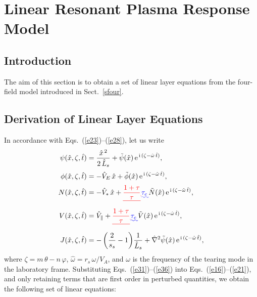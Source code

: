 \documentclass[12pt,prb,aps]{revtex4-1}
\providecommand{\DIFadd}[1]{{\protect\color{blue}\uwave{#1}}} %
\providecommand{\DIFdel}[1]{{\protect\color{red}\sout{#1}}}                      %
\providecommand{\DIFaddbegin}{} %
\providecommand{\DIFaddend}{} %
\providecommand{\DIFdelbegin}{} %
\providecommand{\DIFdelend}{} %
\begin{document}
\section{Linear Resonant Plasma Response Model}\label{layer}
\subsection{Introduction}
The aim of this section is to obtain a set of linear layer equations from the four-field model
introduced in Sect.~\ref{sfour}.

\subsection{Derivation of Linear Layer Equations}
In accordance with Eqs.~(\ref{e23})--(\ref{e28}), let us write
\begin{align}\label{e31}
\psi(\hat{x},\zeta,\hat{t}) &= \frac{\hat{x}^{\,2} }{2\,\hat{L}_s}+ \tilde{\psi}(\hat{x})\,{\rm e}^{\,{\rm i}\,(\zeta-\hat{\omega}\,\hat{t})},\\[0.5ex]
\phi(\hat{x},\zeta,\hat{t}) &=-\hat{V}_E\,\hat{x}+ \tilde{\phi}(\hat{x})\,{\rm e}^{\,{\rm i}\,(\zeta-\hat{\omega}\,\hat{t})},\\[0.5ex]
N(\hat{x},\zeta,\hat{t}) &= -\hat{V}_\ast\,\hat{x}+\DIFdelbegin %
\DIFdel{\frac{1+\tau}{\tau}}%
\DIFdel{\!}\DIFdelend \DIFaddbegin \DIFadd{\tau_e\,}\DIFaddend \tilde{N}(\hat{x})\,{\rm e}^{\,{\rm i}\,(\zeta-\hat{\omega}\,\hat{t})},\\[0.5ex]
V(\hat{x},\zeta,\hat{t}) &= \hat{V}_\parallel +\DIFdelbegin %
\DIFdel{\frac{1+\tau}{\tau}}%
\DIFdel{\!}\DIFdelend \DIFaddbegin \DIFadd{\tau_e\,}\DIFaddend \tilde{V}(\hat{x})\,{\rm e}^{\,{\rm i}\,(\zeta-\hat{\omega}\,\hat{t})},\\[0.5ex]
J(\hat{x},\zeta,\hat{t}) &=-\left(\frac{2}{s_s}-1\right)\!\frac{1}{\hat{L}_s}+ \hat{\nabla}^2\tilde{\psi}(\hat{x})\,{\rm e}^{\,{\rm i}\,(\zeta-\hat{\omega}\,\hat{t})},\label{e36}
\end{align}
where $\zeta=m\,\theta-n\,\varphi$, $\hat{\omega}=r_s\,\omega/V_A$, and $\omega$ is the frequency of the tearing mode in the laboratory frame. 
Substituting Eqs.~(\ref{e31})--(\ref{e36}) into Eqs.~(\ref{e16})--(\ref{e21}), 
 and only retaining terms that
are first order in perturbed quantities, we obtain the following set of linear equations:
\end{document}
